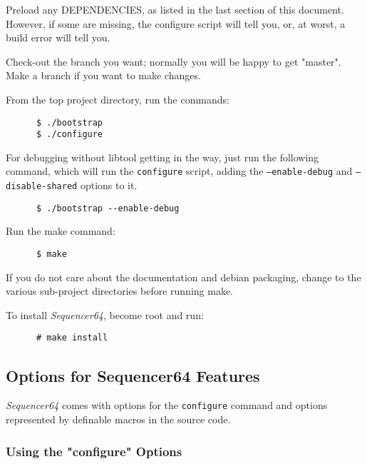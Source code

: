    \begin{enumber}
      \item Preload any DEPENDENCIES, as listed in the last section
         of this document.
          However, if some are missing, the configure script will tell you,
          or, at worst, a build error will tell you.
      \item Check-out the branch you want; normally you will be happy to
         get "master".  Make a branch if you want to make changes.
      \item From the top project directory, run the commands:
\begin{verbatim}
      $ ./bootstrap
      $ ./configure
\end{verbatim}
      \item For debugging without libtool getting in the way, just run the
         following command, which will run the
         \texttt{configure} script, adding the
         \texttt{--enable-debug} and
         \texttt{--disable-shared} options to it.
\begin{verbatim}
      $ ./bootstrap --enable-debug
\end{verbatim}
      \item Run the make command:
\begin{verbatim}
      $ make
\end{verbatim}
      If you do not care about the documentation and debian packaging,
      change to the various sub-project directories before running make.
      \item To install \textsl{Sequencer64}, become root and run:
\begin{verbatim}
      # make install
\end{verbatim}
   \end{enumber}

\subsection{Options for Sequencer64 Features}
\label{subsec:seq64_build_options}

   \textsl{Sequencer64} comes with options for the \texttt{configure} command
   and options represented by definable macros in the source code.

\subsubsection{Using the "configure" Options}
\label{subsubsec:seq64_build_configure}

